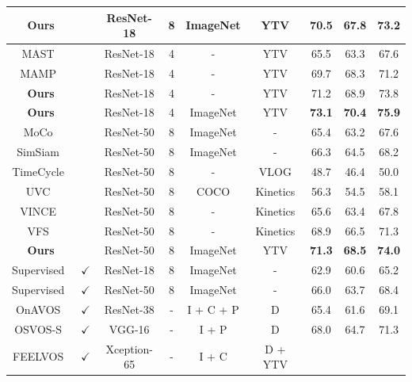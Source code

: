 \documentclass{article}
\begin{document}
\begin{table}[t]
{\begin{tabular}{ccccccccc}
      \textbf{Ours} & & ResNet-18 & 8 & ImageNet & YTV
			& \textbf{70.5} & \textbf{67.8} & \textbf{73.2} \\
      \hline
      MAST~\cite{lai2020mast} & & ResNet-18 & 4 & - & YTV
			& 65.5 & 63.3  & 67.6  \\
      MAMP~\cite{miao2021self} & & ResNet-18 & 4 & - & YTV
			& 69.7 & 68.3   & 71.2  \\
      \textbf{Ours} & & ResNet-18 & 4 & - & YTV
			& 71.2  & 68.9 & 73.8 \\
      \textbf{Ours} & & ResNet-18 & 4 & ImageNet & YTV
			& \textbf{73.1} & \textbf{70.4} & \textbf{75.9} \\
			\hline
      MoCo~\cite{he2020momentum} & & ResNet-50 & 8 & ImageNet &-
			& 65.4 & 63.2  & 67.6  \\
      SimSiam~\cite{chen2021exploring} & & ResNet-50 & 8 & ImageNet &-
			& 66.3 & 64.5  & 68.2  \\
      TimeCycle~\cite{wang2019learning} & & ResNet-50 & 8 & - & VLOG
			& 48.7 & 46.4  & 50.0  \\
      UVC~\cite{li2019joint}  & & ResNet-50 & 8 & COCO & Kinetics
			& 56.3 & 54.5  & 58.1  \\
      VINCE~\cite{gordon2020watching} & & ResNet-50 & 8 & - & Kinetics
			& 65.6 & 63.4  & 67.8  \\
      VFS~\cite{xu2021rethinking}  & & ResNet-50 & 8 & - & Kinetics
			& 68.9 & 66.5 & 71.3    \\
      \textbf{Ours} & & ResNet-50 & 8 & ImageNet & YTV
			& \textbf{71.3}  & \textbf{68.5} & \textbf{74.0}  \\
      \hline
      Supervised~\cite{he2016deep} &$\checkmark$ & ResNet-18 & 8 & ImageNet & -
			& 62.9 & 60.6  & 65.2  \\
      Supervised~\cite{he2016deep} & $\checkmark$& ResNet-50 & 8 & ImageNet &-
			& 66.0 & 63.7  & 68.4  \\
      OnAVOS~\cite{voigtlaender2017online} & $\checkmark$ & ResNet-38 & - & I + C + P & D
			& 65.4 & 61.6  & 69.1  \\
      OSVOS-S~\cite{maninis2018video}  & $\checkmark$ & VGG-16 & - & I + P & D
			& 68.0   & 64.7 & 71.3  \\
      FEELVOS~\cite{voigtlaender2019feelvos}  & $\checkmark$ & Xception-65 & - & I + C & D + YTV

\end{tabular}}
\end{table}
\end{document}

